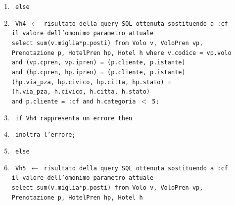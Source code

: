 \documentclass[a4paper,12pt]{report}
\begin{document}
\begin{enumerate}[label*=\arabic*]
          \item \texttt{\hspace*{1cm} else}
          \item \texttt{\hspace*{2cm} Vh4 $\leftarrow$ risultato della query SQL ottenuta sostituendo a :cf \\
            \hspace*{3cm} il valore dell'omonimo parametro attuale \\
            \hspace*{3cm} select sum(v.miglia*p.posti) from Volo v, VoloPren vp, \\
            \hspace*{4cm} Prenotazione p, HotelPren hp, Hotel h where v.codice = vp.volo \\
            \hspace*{4cm} and (vp.cpren, vp.ipren) = (p.cliente, p.istante) \\
            \hspace*{4cm} and (hp.cpren, hp.ipren) = (p.cliente, p.istante) \\
            \hspace*{4cm} (hp.via\_pza, hp.civico, hp.citta, hp.stato) = \\
            \hspace*{5cm} (h.via\_pza, h.civico, h.citta, h.stato) \\
            \hspace*{4cm} and p.cliente = :cf and h.categoria $<$ 5;}
          \item \texttt{\hspace*{2cm} if Vh4 rappresenta un errore then}
          \item \texttt{\hspace*{3cm} inoltra l'errore;}
          \item \texttt{\hspace*{2cm} else}
          \item \texttt{\hspace*{3cm} Vh5 $\leftarrow$ risultato della query SQL ottenuta sostituendo a :cf \\
            \hspace*{4cm} il valore dell'omonimo parametro attuale \\
            \hspace*{4cm} select sum(v.miglia*p.posti) from Volo v, VoloPren vp, \\
            \hspace*{5cm} Prenotazione p, HotelPren hp, Hotel h \\
}
\end{enumerate}
\end{document}
